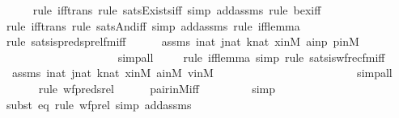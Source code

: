 \begin{isabellebody}
\ \ \ \ \isamarkupfalse%
{\isacharparenleft}{\kern0pt}rule\ iff{\isacharunderscore}{\kern0pt}trans{\isacharcomma}{\kern0pt}\ rule\ sats{\isacharunderscore}{\kern0pt}Exists{\isacharunderscore}{\kern0pt}iff{\isacharcomma}{\kern0pt}\ simp\ add{\isacharcolon}{\kern0pt}assms{\isacharcomma}{\kern0pt}\ rule\ bex{\isacharunderscore}{\kern0pt}iff{\isacharparenright}{\kern0pt}\isanewline
\ \ \ \ \isamarkupfalse%
{\isacharparenleft}{\kern0pt}rule\ iff{\isacharunderscore}{\kern0pt}trans{\isacharcomma}{\kern0pt}\ rule\ sats{\isacharunderscore}{\kern0pt}And{\isacharunderscore}{\kern0pt}iff{\isacharcomma}{\kern0pt}\ simp\ add{\isacharcolon}{\kern0pt}assms{\isacharcomma}{\kern0pt}\ rule\ iff{\isacharunderscore}{\kern0pt}lemma{}{\isacharparenright}{\kern0pt}\isanewline
\ \ \ \ \ \isamarkupfalse%
{\isacharparenleft}{\kern0pt}rule\ sats{\isacharunderscore}{\kern0pt}is{\isacharunderscore}{\kern0pt}preds{\isacharunderscore}{\kern0pt}prel{\isacharunderscore}{\kern0pt}fm{\isacharunderscore}{\kern0pt}iff{\isacharparenright}{\kern0pt}\isanewline
\ \ \ \ \isamarkupfalse%
\ assms\ inat\ jnat\ knat\ xinM\ ainp\ pinM\isanewline
\ \ \ \ \ \ \ \ \ \ \ \ \ \ \ \ \ \ \isamarkupfalse%
\ simp{\isacharunderscore}{\kern0pt}all\isanewline
\ \ \ \ \isamarkupfalse%
{\isacharparenleft}{\kern0pt}rule\ iff{\isacharunderscore}{\kern0pt}lemma{}{\isacharcomma}{\kern0pt}\ simp{\isacharcomma}{\kern0pt}\ rule\ sats{\isacharunderscore}{\kern0pt}is{\isacharunderscore}{\kern0pt}wfrec{\isacharunderscore}{\kern0pt}fm{\isacharunderscore}{\kern0pt}iff{\isacharparenright}{\kern0pt}\isanewline
\ \ \ \ \isamarkupfalse%
\ assms\ inat\ jnat\ knat\ xinM\ ainM\ vinM\ \isanewline
\ \ \ \ \ \ \ \ \ \ \ \ \ \ \ \ \ \ \ \ \ \ \isamarkupfalse%
\ simp{\isacharunderscore}{\kern0pt}all\isanewline
\ \ \ \ \ \isamarkupfalse%
{\isacharparenleft}{\kern0pt}rule\ wf{\isacharunderscore}{\kern0pt}preds{\isacharunderscore}{\kern0pt}rel{\isacharparenright}{\kern0pt}\isanewline
\ \ \ \ \isamarkupfalse%
\ pair{\isacharunderscore}{\kern0pt}in{\isacharunderscore}{\kern0pt}M{\isacharunderscore}{\kern0pt}iff\ \isanewline
\ \ \ \ \ \ \isamarkupfalse%
\ simp\isanewline
\ \ \ \ \ \isamarkupfalse%
{\isacharparenleft}{\kern0pt}subst\ eq{}{\isacharcomma}{\kern0pt}\ rule\ wf{\isacharunderscore}{\kern0pt}prel{\isacharcomma}{\kern0pt}\ simp\ add{\isacharcolon}{\kern0pt}assms{\isacharparenright}{\kern0pt}\isanewline

\end{isabellebody}
